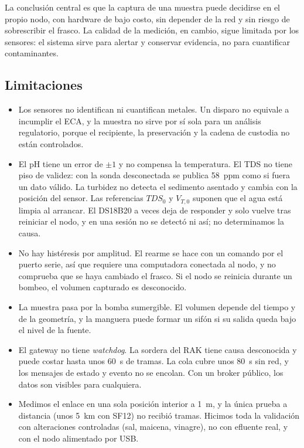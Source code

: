 La conclusión central es que la captura de una muestra puede decidirse en el propio nodo, con hardware de bajo costo, sin depender de la red y sin riesgo de sobrescribir el frasco. La calidad de la medición, en cambio, sigue limitada por los sensores: el sistema sirve para alertar y conservar evidencia, no para cuantificar contaminantes.

\subsection{Limitaciones}

\begin{itemize}
    \item Los sensores no identifican ni cuantifican metales. Un disparo no equivale a incumplir el ECA, y la muestra no sirve por sí sola para un análisis regulatorio, porque el recipiente, la preservación y la cadena de custodia no están controlados.
    \item El pH tiene un error de $\pm 1$ y no compensa la temperatura. El TDS no tiene piso de validez: con la sonda desconectada se publica 58~ppm como si fuera un dato válido. La turbidez no detecta el sedimento asentado y cambia con la posición del sensor. Las referencias $TDS_0$ y $V_{T,0}$ suponen que el agua está limpia al arrancar. El DS18B20 a veces deja de responder y solo vuelve tras reiniciar el nodo, y en una sesión no se detectó ni así; no determinamos la causa.
    \item No hay histéresis por amplitud. El rearme se hace con un comando por el puerto serie, así que requiere una computadora conectada al nodo, y no comprueba que se haya cambiado el frasco. Si el nodo se reinicia durante un bombeo, el volumen capturado es desconocido.
    \item La muestra pasa por la bomba sumergible. El volumen depende del tiempo y de la geometría, y la manguera puede formar un sifón si su salida queda bajo el nivel de la fuente.
    \item El gateway no tiene \textit{watchdog}. La sordera del RAK tiene causa desconocida y puede costar hasta unos 60~s de tramas. La cola cubre unos 80~s sin red, y los mensajes de estado y evento no se encolan. Con un broker público, los datos son visibles para cualquiera.
    \item Medimos el enlace en una sola posición interior a 1~m, y la única prueba a distancia (unos 5~km con SF12) no recibió tramas. Hicimos toda la validación con alteraciones controladas (sal, maicena, vinagre), no con efluente real, y con el nodo alimentado por USB.
\end{itemize}

